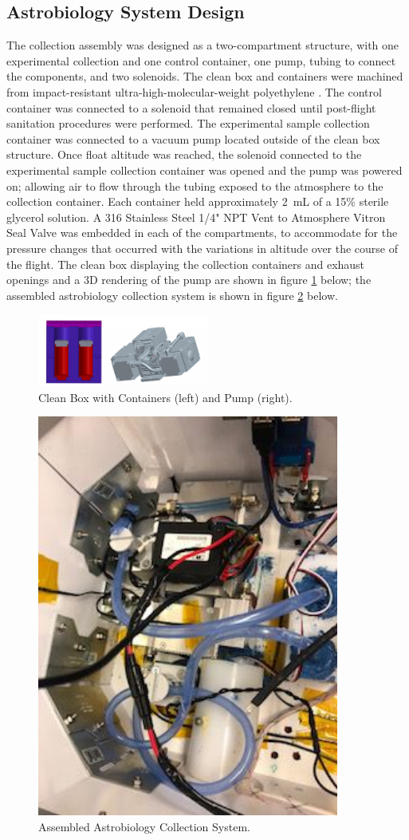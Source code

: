 \newpage
\subsection{Astrobiology System Design}
\label{sec:Astrobiology Design}
The collection assembly was designed as a two-compartment structure, with one experimental collection and one control container, one pump, tubing to connect the components, and two solenoids. The clean box and containers were machined from impact-resistant ultra-high-molecular-weight polyethylene \cite{cleanbox}. The control container was connected to a solenoid that remained closed until post-flight sanitation procedures were performed. The experimental sample collection container was connected to a vacuum pump located outside of the clean box structure. Once float altitude was reached, the solenoid connected to the experimental sample collection container was opened and the pump was powered on; allowing air to flow through the tubing exposed to the atmosphere to the collection container. Each container held approximately \SI{2}{\milli\liter} of a 15\% sterile glycerol solution. A 316 Stainless Steel 1/4" NPT Vent to Atmosphere Vitron Seal Valve was embedded in each of the compartments, to accommodate for the pressure changes that occurred with the variations in altitude over the course of the flight. The clean box displaying the collection containers and exhaust openings and a 3D rendering of the pump are shown in figure \ref{fig:Astro System} below; the assembled astrobiology collection system is shown in figure \ref{fig:Astro_Assembly} below.
%
\begin{figure}[H]
	\begin{center}
		\includegraphics[width=0.5\textwidth]{figures/Astro_Figs.pdf}
		\caption{Clean Box with Containers (left) and Pump (right).}
		\label{fig:Astro System}
	\end{center}
\end{figure}
%
\begin{figure}[H]
  \begin{center}
    \includegraphics[width=60 mm, scale=0.5]{figures/AstroAssembly.pdf}
    \caption{Assembled Astrobiology Collection System.}
    \label{fig:Astro_Assembly}
  \end{center}
\end{figure}
